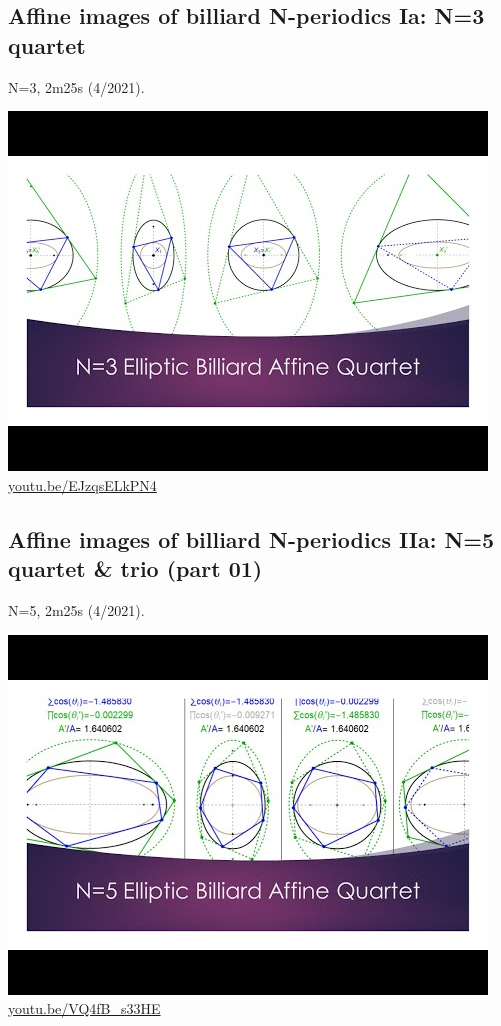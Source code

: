 \documentclass[12pt]{amsart}
\begin{document}
\subsection{Affine images of billiard N-periodics Ia: N=3 quartet}
\label{vid:EJzqsELkPN4}
\noindent N=3, 2m25s (4/2021). 
\begin{center}\includegraphics[width=.5\textwidth]{pics/EJzqsELkPN4.jpg} \\ 
\href{https://youtu.be/EJzqsELkPN4}{\url{youtu.be/EJzqsELkPN4}}\end{center}
% 

\subsection{Affine images of billiard N-periodics IIa: N=5 quartet \& trio (part 01)}
\label{vid:VQ4fB_s33HE}
\noindent N=5, 2m25s (4/2021). 
\begin{center}\includegraphics[width=.5\textwidth]{pics/VQ4fB_s33HE.jpg} \\ 
\href{https://youtu.be/VQ4fB_s33HE}{\url{youtu.be/VQ4fB\_s33HE}}\end{center}
% 
\end{document}
